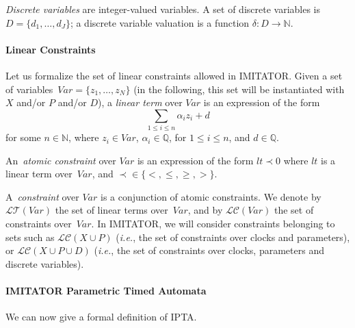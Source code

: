 \documentclass[a4paper,11pt]{report}
\newcommand{\Clock}{X} %
\newcommand{\dval}{\ensuremath{\delta}} %
\newcommand{\DVar}{D} %
\newcommand{\dvar}{d} %
\newcommand{\DVarCard}{J} %
\newcommand{\LConstraint}{\mathcal{LC}} %
\newcommand{\LConstraintXP}{\LConstraint(\Clock \cup \Param)}
\newcommand{\LConstraintXPD}{\LConstraint(\Clock \cup \Param \cup \DVar)}
\newcommand{\lterm}{\mathit{lt}}
\newcommand{\LTerm}{\mathcal{LT}} %
\newcommand{\Param}{P} %
\newcommand{\Var}{\mathit{Var}} %
\newcommand{\var}{\mathit{z}} %
\newcommand{\VarCard}{N} %
\newcommand{\grandn}{{\mathbb N}}
\newcommand{\grandq}{{\mathbb Q}}
\newcommand{\imitator}{\textsf{IMITATOR}}
\newcommand{\IPTA}{IPTA}
\newcommand{\ie}{\textcolor{colorok}{\textit{i.e.}, }}
\begin{document}
\emph{Discrete variables} are integer-valued variables.
A set of discrete variables is $\DVar = \{ \dvar_1, \dots, \dvar_\DVarCard \} $;
a discrete variable valuation is a function $\dval \colon \DVar \rightarrow \grandn$.


\paragraph{Linear Constraints}
Let us formalize the set of linear constraints allowed in \imitator{}.
Given a set of variables~$\Var = \{ \var_1, \dots, \var_\VarCard \}$ (in the following, this set will be instantiated with $\Clock$ and/or $\Param$ and/or $\DVar$), a \emph{linear term} over $\Var$ is an expression of the form
$$
\sum_{1 \leq i \leq n} \alpha_i \var_i + d
$$
for some $n \in \grandn$,
	where
	$\var_{i} \in \Var$,
	$\alpha_{i} \in \grandq$, for $1 \leq i \leq n$,
	and
	$d \in \grandq$.

An~\emph{atomic constraint} over $\Var$ is an expression of the form
$
\lterm \prec 0
$
	where
	$\lterm$ is a linear term over~$\Var$,
	and
	$\prec \in \{<, \leq, \geq, >\}$.

A~\emph{constraint} over $\Var$ is a conjunction of atomic constraints.
We denote by $\LTerm(\Var)$ the set of linear terms over~$\Var$, and by $\LConstraint(\Var)$ the set of constraints over~$\Var$.
In \imitator{}, we will consider constraints belonging to sets such as $\LConstraintXP$ (\ie{} the set of constraints over clocks and parameters), or $\LConstraintXPD$ (\ie{} the set of constraints over clocks, parameters and discrete variables).



\paragraph{\imitator{} Parametric Timed Automata}
We can now give a formal definition of \IPTA{}.
\end{document}
